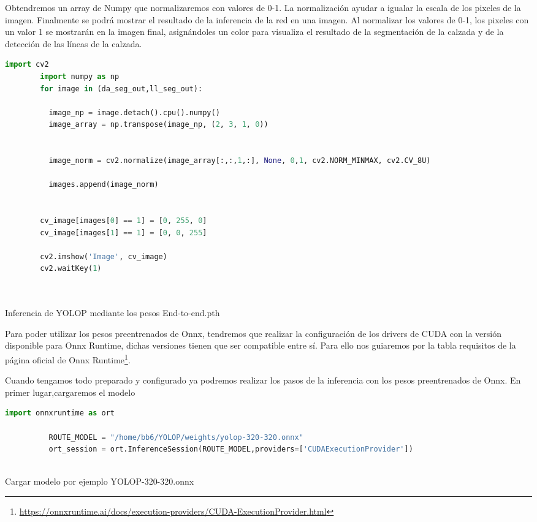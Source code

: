     Obtendremos un array de Numpy que normalizaremos con valores de 0-1. La normalización 
    ayudar a igualar la escala de los pixeles de la imagen. Finalmente se podrá mostrar el resultado de la inferencia de la red 
    en una imagen. Al normalizar los valores de 0-1, los pixeles con un valor 1 se mostrarán en la imagen final, asignándoles un color
    para visualiza el resultado de la segmentación de la calzada y de la detección de las líneas de la calzada. \newline
    \newpage
    \begin{code}[h]
      \begin{lstlisting}[language=Python]
        import cv2
        import numpy as np
        for image in (da_seg_out,ll_seg_out):

          image_np = image.detach().cpu().numpy()
          image_array = np.transpose(image_np, (2, 3, 1, 0))

        
          image_norm = cv2.normalize(image_array[:,:,1,:], None, 0,1, cv2.NORM_MINMAX, cv2.CV_8U)

          images.append(image_norm)

    
        cv_image[images[0] == 1] = [0, 255, 0]
        cv_image[images[1] == 1] = [0, 0, 255]

        cv2.imshow('Image', cv_image)
        cv2.waitKey(1)

    
      \end{lstlisting}
      \caption[Resultado de la inferencia del modelo YOLOP]{Inferencia de YOLOP mediante los pesos End-to-end.pth}
      \label{cod:codejemplo}
      \end{code}  

      Para poder utilizar los pesos preentrenados de Onnx, tendremos que realizar la configuración de los drivers de CUDA con la versión disponible para Onnx Runtime, 
      dichas versiones tienen que ser compatible entre sí. Para ello nos guiaremos por la tabla requisitos de la página oficial de Onnx Runtime\footnote{\url{https://onnxruntime.ai/docs/execution-providers/CUDA-ExecutionProvider.html}}. \newline

      Cuando tengamos todo preparado y configurado ya podremos realizar los pasos de la inferencia con los pesos preentrenados de Onnx. En primer lugar,cargaremos el modelo
      
      \begin{code}[h]
        \begin{lstlisting}[language=Python]
          import onnxruntime as ort

          ROUTE_MODEL = "/home/bb6/YOLOP/weights/yolop-320-320.onnx"
          ort_session = ort.InferenceSession(ROUTE_MODEL,providers=['CUDAExecutionProvider'])
      
        \end{lstlisting}
        \caption[Cargar modelo]{Cargar modelo por ejemplo YOLOP-320-320.onnx}
        \label{yolop320}
        \end{code}  

